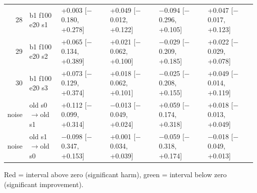 \documentclass[10pt,a4paper]{article}
\begin{document}
\begin{table}[h]
\begin{tabular}{rlllll}
28 & b1 f100 e20 s1 & +0.003 [$-$0.180, +0.278] & +0.049 [$-$0.012, +0.122] & $-$0.094 [$-$0.296, +0.105] & +0.047 [$-$0.017, +0.123]\\
29 & b1 f100 e20 s2 & +0.065 [$-$0.134, +0.389] & +0.021 [$-$0.062, +0.100] & $-$0.029 [$-$0.209, +0.185] & +0.022 [$-$0.029, +0.078]\\
30 & b1 f100 e20 s3 & +0.073 [$-$0.129, +0.374] & +0.018 [$-$0.062, +0.101] & $-$0.025 [$-$0.208, +0.155] & +0.049 [$-$0.014, +0.119]\\
\midrule
noise & old s0$\rightarrow$old s1 & +0.112 [$-$0.099, +0.314] & $-$0.013 [$-$0.049, +0.024] & +0.059 [$-$0.174, +0.318] & +0.018 [$-$0.013, +0.049]\\
noise & old s1$\rightarrow$old s0 & $-$0.098 [$-$0.347, +0.153] & +0.001 [$-$0.034, +0.039] & $-$0.059 [$-$0.318, +0.174] & $-$0.018 [$-$0.049, +0.013]\\
\bottomrule\end{tabular}\end{table}
Red = interval above zero (significant harm), green = interval below zero (significant improvement).
\end{document}
